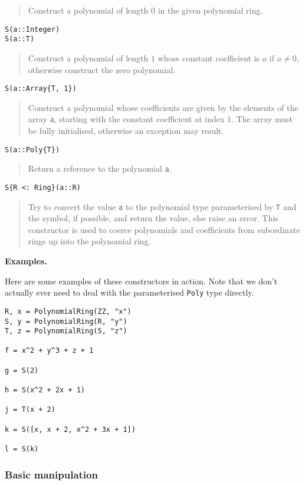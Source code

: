 \documentclass[a4paper,10pt]{article}
\newcommand{\code}{\lstinline}
\newcommand{\desc}[1]{\vspace{-3mm}\begin{quote}#1\end{quote}}
\begin{document}
\desc{Construct a polynomial of length $0$ in the given polynomial ring.}

\begin{lstlisting}
S(a::Integer)
S(a::T)
\end{lstlisting}

\desc{Construct a polynomial of length $1$ whose constant coefficient is $a$ if
$a \neq 0$, otherwise construct the zero polynomial.}

\begin{lstlisting}
S(a::Array{T, 1})
\end{lstlisting}

\desc{Construct a polynomial whose coefficients are given by the elements of the array
\code{a}, starting with the constant coefficient at index $1$. The array must be fully
initialised, otherwise an exception may result.}

\begin{lstlisting}
S(a::Poly{T})
\end{lstlisting}

\desc{Return a reference to the polynomial \code{a}.}

\begin{lstlisting}
S{R <: Ring}(a::R)
\end{lstlisting}

\desc{Try to convert the value \code{a} to the polynomial type parameterised by 
\code{T} and the symbol, if possible, and return the value, else raise an error. 
This constructor is used to coerce polynomials and coefficients from subordinate rings
up into the polynomial ring.}

\textbf{Examples.}

Here are some examples of these constructors in action. Note that we don't actually
ever need to deal with the parameterised \code{Poly} type directly.

\begin{lstlisting}
R, x = PolynomialRing(ZZ, "x")
S, y = PolynomialRing(R, "y")
T, z = PolynomialRing(S, "z")

f = x^2 + y^3 + z + 1

g = S(2)

h = S(x^2 + 2x + 1)

j = T(x + 2)

k = S([x, x + 2, x^2 + 3x + 1])

l = S(k)
\end{lstlisting}

\subsubsection{Basic manipulation}
\end{document}
